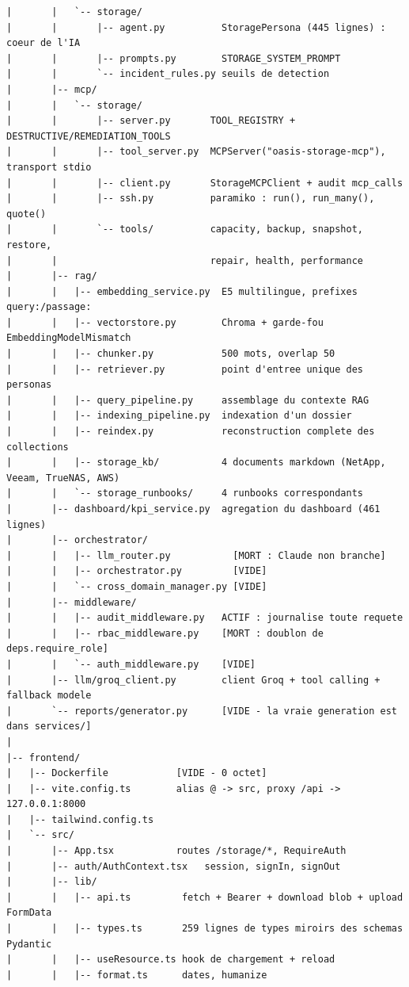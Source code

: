 \begin{lstlisting}[caption={Arborescence réelle --- les fichiers vides sont signalés}]
|       |   `-- storage/
|       |       |-- agent.py          StoragePersona (445 lignes) : coeur de l'IA
|       |       |-- prompts.py        STORAGE_SYSTEM_PROMPT
|       |       `-- incident_rules.py seuils de detection
|       |-- mcp/
|       |   `-- storage/
|       |       |-- server.py       TOOL_REGISTRY + DESTRUCTIVE/REMEDIATION_TOOLS
|       |       |-- tool_server.py  MCPServer("oasis-storage-mcp"), transport stdio
|       |       |-- client.py       StorageMCPClient + audit mcp_calls
|       |       |-- ssh.py          paramiko : run(), run_many(), quote()
|       |       `-- tools/          capacity, backup, snapshot, restore,
|       |                           repair, health, performance
|       |-- rag/
|       |   |-- embedding_service.py  E5 multilingue, prefixes query:/passage:
|       |   |-- vectorstore.py        Chroma + garde-fou EmbeddingModelMismatch
|       |   |-- chunker.py            500 mots, overlap 50
|       |   |-- retriever.py          point d'entree unique des personas
|       |   |-- query_pipeline.py     assemblage du contexte RAG
|       |   |-- indexing_pipeline.py  indexation d'un dossier
|       |   |-- reindex.py            reconstruction complete des collections
|       |   |-- storage_kb/           4 documents markdown (NetApp, Veeam, TrueNAS, AWS)
|       |   `-- storage_runbooks/     4 runbooks correspondants
|       |-- dashboard/kpi_service.py  agregation du dashboard (461 lignes)
|       |-- orchestrator/
|       |   |-- llm_router.py           [MORT : Claude non branche]
|       |   |-- orchestrator.py         [VIDE]
|       |   `-- cross_domain_manager.py [VIDE]
|       |-- middleware/
|       |   |-- audit_middleware.py   ACTIF : journalise toute requete
|       |   |-- rbac_middleware.py    [MORT : doublon de deps.require_role]
|       |   `-- auth_middleware.py    [VIDE]
|       |-- llm/groq_client.py        client Groq + tool calling + fallback modele
|       `-- reports/generator.py      [VIDE - la vraie generation est dans services/]
|
|-- frontend/
|   |-- Dockerfile            [VIDE - 0 octet]
|   |-- vite.config.ts        alias @ -> src, proxy /api -> 127.0.0.1:8000
|   |-- tailwind.config.ts
|   `-- src/
|       |-- App.tsx           routes /storage/*, RequireAuth
|       |-- auth/AuthContext.tsx   session, signIn, signOut
|       |-- lib/
|       |   |-- api.ts         fetch + Bearer + download blob + upload FormData
|       |   |-- types.ts       259 lignes de types miroirs des schemas Pydantic
|       |   |-- useResource.ts hook de chargement + reload
|       |   |-- format.ts      dates, humanize

\end{lstlisting}
